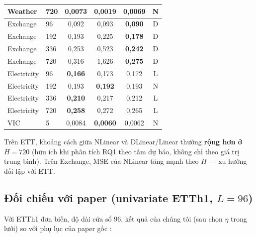\begin{table}[H]
\begin{tabular}{@{}llcccc@{}}
    Weather     & 720   & 0{,}0073         & \textbf{0{,}0019} & 0{,}0069         & N     \\
    \midrule
    Exchange    & 96    & 0{,}092          & 0{,}093           & \textbf{0{,}090} & D     \\
    Exchange    & 192   & 0{,}193          & 0{,}225           & \textbf{0{,}178} & D     \\
    Exchange    & 336   & 0{,}253          & 0{,}523           & \textbf{0{,}242} & D     \\
    Exchange    & 720   & 0{,}316          & 1{,}626           & \textbf{0{,}275} & D     \\
    \midrule
    Electricity & 96    & \textbf{0{,}166} & 0{,}173           & 0{,}172          & L     \\
    Electricity & 192   & 0{,}193          & \textbf{0{,}192}  & 0{,}193          & N     \\
    Electricity & 336   & \textbf{0{,}210} & 0{,}217           & 0{,}212          & L     \\
    Electricity & 720   & \textbf{0{,}258} & 0{,}272           & 0{,}265          & L     \\
    \midrule
    VIC         & 5     & 0{,}0084         & \textbf{0{,}0060} & 0{,}0062         & N     \\
    \bottomrule
  \end{tabular}
\end{table}

Trên ETT, khoảng cách giữa NLinear và DLinear/Linear thường \textbf{rộng hơn ở \(H{=}720\)}
(hữu ích khi phân tích RQ1 theo tầm dự báo, không chỉ theo giá trị trung bình).
Trên Exchange, MSE của NLinear tăng mạnh theo \(H\) --- xu hướng đối lập với ETT.

\subsection{Đối chiếu với paper (univariate ETTh1, \(L{=}96\))}

Với ETTh1 đơn biến, độ dài cửa sổ \(96\), kết quả của chúng tôi
(sau chọn \(\eta\) trong lưới) so với phụ lục của paper gốc \cite{zeng2023ltsf}:

